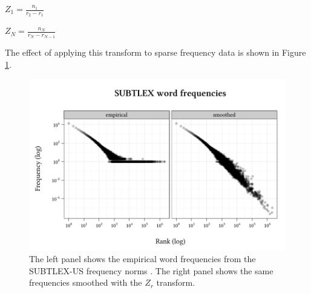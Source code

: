 \begin{unlabeledexample}
$\displaystyle Z_1 = \frac{n_1}{r_2 - r_1}$
\end{unlabeledexample}

\begin{unlabeledexample}
$\displaystyle Z_N = \frac{n_N}{r_N - r_{N - 1}}$
\end{unlabeledexample}

\noindent The effect of applying this transform to sparse frequency data is shown in Figure \ref{subtlex}.

\begin{figure}
\centering
\includegraphics{zr.pdf}
\caption{The left panel shows the empirical word frequencies from the SUBTLEX-US frequency norms \citep{Brysbaert2009}. The right panel shows the same frequencies smoothed with the $Z_r$ transform.}
\label{subtlex}
\end{figure}
